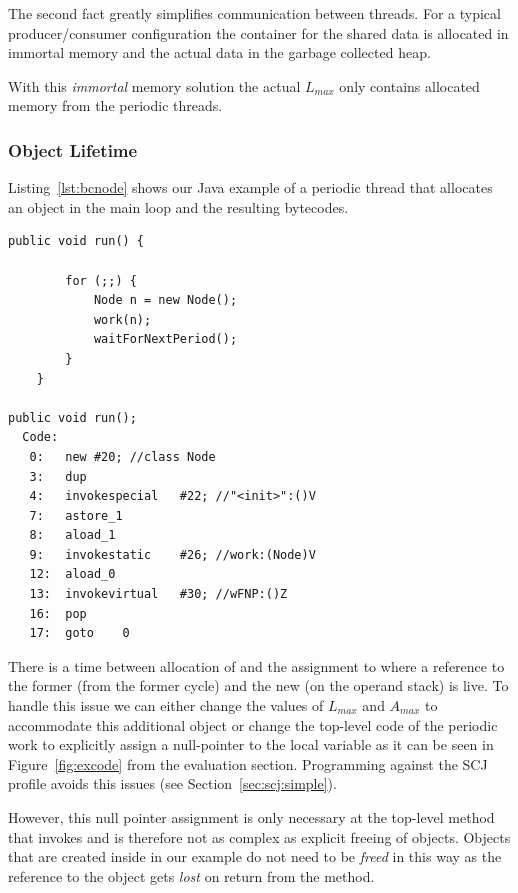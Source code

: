 The second fact greatly simplifies communication between threads.
For a typical producer/consumer configuration the container for the
shared data is allocated in immortal memory and the actual data in
the garbage collected heap.

With this \emph{immortal} memory solution the actual $L_{max}$ only
contains allocated memory from the periodic threads.

\subsubsection{Object Lifetime} \label{sec:wc:live}

Listing~\ref{lst:bcnode} shows our Java example of a periodic thread
that allocates an object in the main loop and the resulting
bytecodes.

\begin{lstlisting}[float, caption={Example periodic thread and the corresponding Java bytecodes},
label=lst:bcnode]
    public void run() {

        for (;;) {
            Node n = new Node();
            work(n);
            waitForNextPeriod();
        }
    }

public void run();
  Code:
   0:   new #20; //class Node
   3:   dup
   4:   invokespecial   #22; //"<init>":()V
   7:   astore_1
   8:   aload_1
   9:   invokestatic    #26; //work:(Node)V
   12:  aload_0
   13:  invokevirtual   #30; //wFNP:()Z
   16:  pop
   17:  goto    0
\end{lstlisting}

There is a time between allocation of  and the assignment
to  where a reference to the former  (from the
former cycle) and the new  (on the operand stack) is
live. To handle this issue we can either change the values of
$L_{max}$ and $A_{max}$ to accommodate this additional object or
change the top-level code of the periodic work to explicitly assign
a null-pointer to the local variable  as it can be seen in
Figure~\ref{fig:excode} from the evaluation section. Programming
against the SCJ profile avoids this issues (see
Section~\ref{sec:scj:simple}).

However, this null pointer assignment is only necessary at the
top-level method that invokes  and is
therefore not as complex as explicit freeing of objects. Objects
that are created inside  in our example do not need to be
\emph{freed} in this way as the reference to the object gets
\emph{lost} on return from the method.

